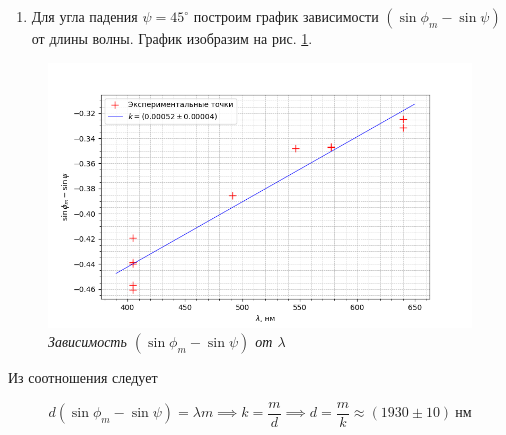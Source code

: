 \documentclass[a4paper,12pt]{article}
\begin{document}
\begin{enumerate}
    \item Для угла падения $\psi = 45^\circ$ построим график зависимости $(\sin{\phi_m} - \sin{\psi})$ от длины волны. График изобразим на рис. \ref{graph:1}.
\end{enumerate}

\FloatBarrier
\begin{figure}[!ht]
        \centering
	\includegraphics[width=1.0\textwidth]{graph-1.png}
	\caption{\textit{Зависимость $(\sin{\phi_m} - \sin{\psi})$ от $\lambda$}}
	\label{graph:1}
\end{figure}
\FloatBarrier

Из соотношения следует

\begin{equation*}
    d (\sin{\phi_m} - \sin{\psi}) = \lambda m \implies k = \frac{m}{d} \implies d = \frac{m}{k} \approx (1930 \pm 10) \ \text{нм}
\end{equation*}
\end{document}
